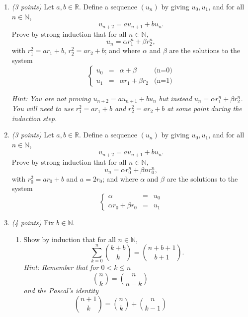 \documentclass[12pt]{article}
\begin{document}
\begin{enumerate}

\item \emph{(3 points)} Let \( a, b \in \mathbb{R} \). Define a sequence \( (u_n) \) by giving \( u_0, u_1 \), and for all \( n \in \mathbb{N} \),
\[
u_{n+2} = a u_{n+1} + b u_n.
\]
Prove by strong induction that for all \( n \in \mathbb{N} \),
\[
u_n = \alpha r_1^n + \beta r_2^n,
\]
with \( r_1^2 = a r_1 + b \), \( r_2^2 = a r_2 + b \); and where \( \alpha \) and \( \beta \) are the solutions to the system
\[
\left\{
\begin{array}{rcll}
u_0 & = & \alpha + \beta & \text{(n=0)} \\
u_1 &= & \alpha r_1 + \beta r_2 & \text{(n=1)}
\end{array}
\right.
\]

\emph{Hint: You are not proving \( u_{n+2} = a u_{n+1} + b u_n \) but instead \( u_n = \alpha r_1^n + \beta r_2^n \). You will need to use \( r_1^2 = a r_1 + b \) and \( r_2^2 = a r_2 + b \) at some point during the induction step.} \newline


\item \emph{(3 points)} Let \( a, b \in \mathbb{R} \). Define a sequence \( (u_n) \) by giving \( u_0, u_1 \), and for all \( n \in \mathbb{N} \),
\[
u_{n+2} = a u_{n+1} + b u_n.
\]
Prove by strong induction that for all \( n \in \mathbb{N} \),
\[
u_n = \alpha r_0^n + \beta n r_0^n,
\]
with \( r_0^2 = a r_0 + b \) and \( a = 2r_0 \); and where \( \alpha \) and \( \beta \) are the solutions to the system
\[
\left\{
\begin{array}{rcl}
  \alpha & = & u_0 \\
  \alpha r_0 + \beta r_0 & = & u_1
\end{array}
\right.
\] \newline



\item \emph{(4 points)} Fix \( b \in \mathbb{N} \).

\begin{enumerate}
\item Show by induction that for all \( n \in \mathbb{N} \),
\[
\sum_{k = 0}^n \binom{k+b}{k} = \binom{n + b + 1}{b+1}.
\]
\emph{Hint: Remember that for \( 0 < k \leq n \)} 
\[
\binom{n}{k} = \binom{n}{n-k} \hspace{1cm} \hspace{1cm} 
\]
\emph{and the Pascal's identity}
\[
\binom{n+1}{k} = \binom{n}{k} + \binom{n}{k-1}  \hspace{1cm} \hspace{1cm} 
\] \newline


\end{enumerate}
\end{enumerate}
\end{document}
